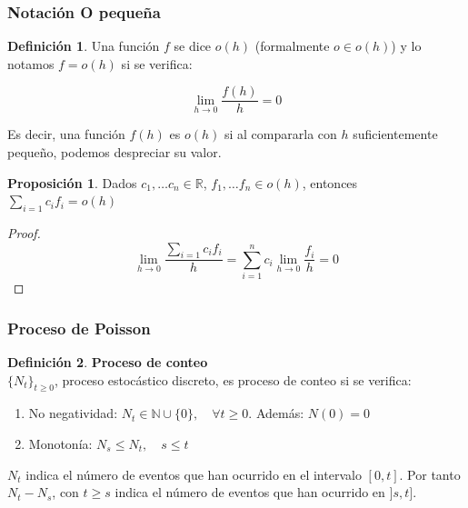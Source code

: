 \documentclass[a4paper,10pt]{scrartcl}
\theoremstyle{definition}
\newtheorem*{mydef}{Definición}
\newtheorem*{fact}{Proposición}
\numberwithin{equation}{section}
\begin{document}
\subsubsection{Notación O pequeña}
  \begin{mydef} 
  Una función $f$ se dice $o(h)$ (formalmente $o\in o(h)$) y lo notamos $f=o(h)$ si se verifica:
  
  \[\lim_{h\rightarrow 0} \frac{f(h)}{h} = 0\]
  \end{mydef}

  Es decir, una función $f(h)$ es $o(h)$ si al compararla con $h$ suficientemente pequeño, podemos despreciar su
  valor.

  \begin{fact}
  Dados $c_1, \ldots c_n \in \mathbb{R}$, $f_1, \ldots f_n \in o(h)$, entonces $\sum_{i=1} c_i f_i = o(h)$
  \end{fact}

  \begin{proof}
  \[\lim_{h\rightarrow 0} \frac{\sum_{i=1} c_i f_i}{h} = \sum_{i=1}^n{c_i \lim_{h\rightarrow 0} \frac{f_i}{h}} = 0\]
  \end{proof}

\subsubsection{Proceso de Poisson}

  \begin{mydef} \textbf{Proceso de conteo}\\
  $\{N_t\}_{t\ge 0}$, proceso estocástico discreto, es proceso de conteo si se verifica:
  \begin{enumerate}
    \item No negatividad: $N_t \in \mathbb{N}\cup\{0\}, \quad \forall t\ge 0$. Además: $N(0)=0$
    \item Monotonía: $N_s \le N_t, \quad s \le t$
  \end{enumerate}

  $N_t$ indica el número de eventos que han ocurrido en el intervalo $[0,t]$. Por tanto $N_t- N_s$, con $t\ge s$
  indica el número de eventos que han ocurrido en $]s,t]$.
  \end{mydef}
\end{document}
